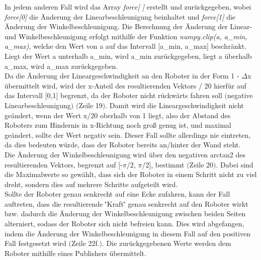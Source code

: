 \documentclass[12pt, a4paper]{report}
\begin{document}
In jedem anderen Fall wird das Array \textit{force[ ]} erstellt und zurückgegeben, wobei \textit{force[0]} die Änderung der Linearbeschleunigung beinhaltet und \textit{force[1]} die Änderung der Winkelbeschleunigung. Die Berechnung der Änderung der Linear- und Winkelbeschleunigung erfolgt mithilfe der Funktion \textit{numpy.clip(a, a\_min, a\_max)}, welche den Wert von a auf das Intervall $[$a\_min, a\_max$]$ beschränkt. Liegt der Wert a unterhalb a\_min, wird a\_min zurückgegeben, liegt a überhalb a\_max, wird a\_max zurückgegeben. \\
Da die Änderung der Lineargeschwindigkeit an den Roboter in der Form 1 - $\Delta$x übermittelt wird, wird der x-Anteil des resultierenden Vektors / 20 hierfür auf das Intervall $[$0,1$]$ begrenzt, da der Roboter nicht rückwärts fahren soll $($negative Linearbeschleunigung$)$ $($Zeile 19$)$. Damit wird die Lineargeschwindigkeit nicht geändert, wenn der Wert x/20 oberhalb von 1 liegt, also der Abstand des Roboters zum Hindernis in x-Richtung noch groß genug ist, und maximal geändert, sollte der Wert negativ sein. Dieser Fall sollte allerdings nie eintreten, da dies bedeuten würde, dass der Roboter bereits an/hinter der Wand steht.\\
Die Änderung der Winkelbeschleunigung wird über den negativen arctan2 des resultierenden Vektors, begrenzt auf $[$-$\pi$/2, $\pi$/2$]$, bestimmt $($Zeile 20$)$. Dabei sind die Maximalwerte so gewählt, dass sich der Roboter in einem Schritt nicht zu viel dreht, sondern dies auf mehrere Schritte aufgeteilt wird.\\
Sollte der Roboter genau senkrecht auf eine Ecke zufahren, kann der Fall auftreten, dass die resultierende \''Kraft\'' genau senkrecht auf den Roboter wirkt bzw. dadurch die Änderung der Winkelbeschleunigung zwischen beiden Seiten alterniert, sodass der Roboter sich nicht befreien kann. Dies wird abgefangen, indem die Änderung der Winkelbeschleunigung in diesem Fall auf den positiven Fall festgesetzt wird $($Zeile  22f.$)$.
Die zurückgegebenen Werte werden dem Roboter mithilfe eines Publishers übermittelt.\\
\end{document}
